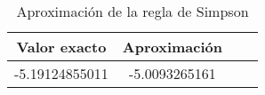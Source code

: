 \begin{table}[h]
  \begin{center}
    \begin{tabular}{|c|c|c|c|} \hline 
      \textbf{Valor exacto} & \textbf{Aproximaci\'on} \\ 
      \hline
      -5.19124855011 & -5.0093265161 \\
      \hline
    \end{tabular}
  \end{center}
  \caption{Aproximaci\'on de la regla de Simpson}
  \label{tab:1}
\end{table}

